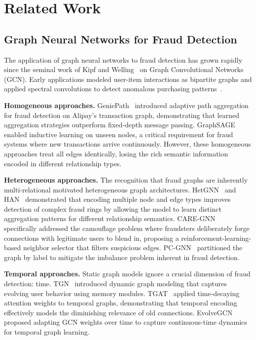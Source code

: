 \documentclass[journal]{IEEEtran}
\begin{document}
\section{Related Work}

\subsection{Graph Neural Networks for Fraud Detection}

The application of graph neural networks to fraud detection has grown rapidly since the seminal work of Kipf and Welling~\cite{kipf2017gcn} on Graph Convolutional Networks (GCN). Early applications modeled user-item interactions as bipartite graphs and applied spectral convolutions to detect anomalous purchasing patterns~\cite{hamilton2017rep}.

\textbf{Homogeneous approaches.} GeniePath~\cite{liu2019geniepath} introduced adaptive path aggregation for fraud detection on Alipay's transaction graph, demonstrating that learned aggregation strategies outperform fixed-depth message passing. GraphSAGE~\cite{hamilton2017graphsage} enabled inductive learning on unseen nodes, a critical requirement for fraud systems where new transactions arrive continuously. However, these homogeneous approaches treat all edges identically, losing the rich semantic information encoded in different relationship types.

\textbf{Heterogeneous approaches.} The recognition that fraud graphs are inherently multi-relational motivated heterogeneous graph architectures. HetGNN~\cite{zhang2019hetgnn} and HAN~\cite{wang2019han} demonstrated that encoding multiple node and edge types improves detection of complex fraud rings by allowing the model to learn distinct aggregation patterns for different relationship semantics. CARE-GNN~\cite{dou2020care} specifically addressed the camouflage problem where fraudsters deliberately forge connections with legitimate users to blend in, proposing a reinforcement-learning-based neighbor selector that filters suspicious edges. PC-GNN~\cite{liu2021pcgnn} partitioned the graph by label to mitigate the imbalance problem inherent in fraud detection.

\textbf{Temporal approaches.} Static graph models ignore a crucial dimension of fraud detection: time. TGN~\cite{rossi2020tgn} introduced dynamic graph modeling that captures evolving user behavior using memory modules. TGAT~\cite{xu2020tgat} applied time-decaying attention weights to temporal graphs, demonstrating that temporal encoding effectively models the diminishing relevance of old connections. EvolveGCN~\cite{pareja2020evolvegcn} proposed adapting GCN weights over time to capture continuous-time dynamics for temporal graph learning.
\end{document}
